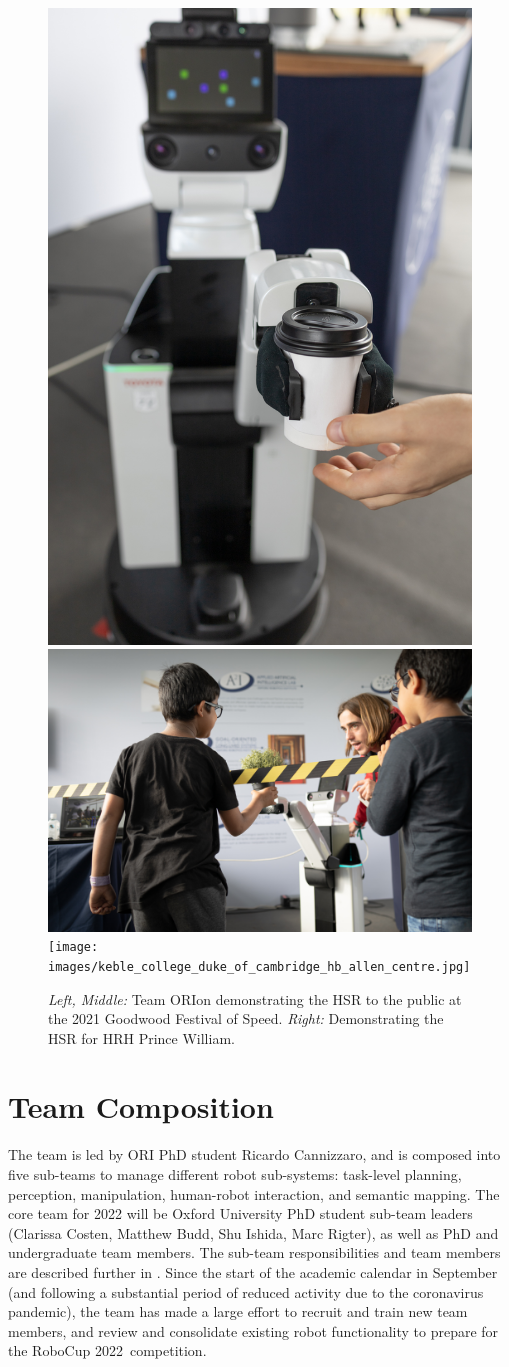 \documentclass[runningheads,a4paper]{llncs}
\newcommand{\competitionyear}{2022}
\newcommand{\robocuptitleshort}{RoboCup \competitionyear}
\begin{document}
\begin{figure}[tb]
	\begin{center}
		\includegraphics[width=.20\columnwidth, clip, trim=0 0ex 0ex 0ex]{images/goodwood_hsr_coffee.jpg}
		\includegraphics[width=.39\columnwidth, clip, trim=20ex 0ex 0ex 0ex]{images/goodwood_demo_with_child.jpg}
		\texttt{[image: images/keble\_college\_duke\_of\_cambridge\_hb\_allen\_centre.jpg]}
	\end{center} 
	\caption{\emph{Left, Middle:} Team ORIon demonstrating the HSR to the public at the 2021 Goodwood Festival of Speed. \emph{Right:} Demonstrating the HSR for HRH Prince William.}
	\label{fig:outreach}
\end{figure}


\section{Team Composition}
The team is led by ORI PhD student Ricardo Cannizzaro, and is composed into five sub-teams to manage different robot sub-systems: task-level planning, perception, manipulation, human-robot interaction, and semantic mapping. The core team for 2022 will be Oxford University PhD student sub-team leaders (Clarissa Costen, Matthew Budd, Shu Ishida, Marc Rigter), as well as PhD and undergraduate team members. The sub-team responsibilities and team members are described further in \cite{OrionWebpageMeetTheTeam}.
Since the start of the academic calendar in September (and following a substantial period of reduced activity due to the coronavirus pandemic), the team has made a large effort to recruit and train new team members, and review and consolidate existing robot functionality to prepare for the \robocuptitleshort\ competition. 
\end{document}
